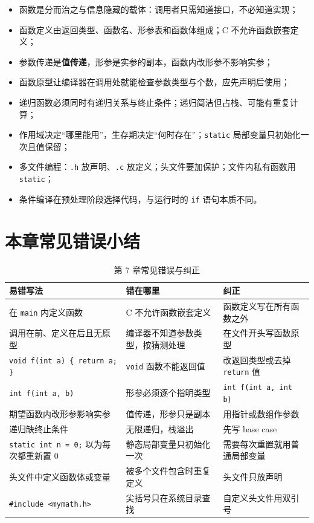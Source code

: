 \begin{itemize}
  \item 函数是分而治之与信息隐藏的载体：调用者只需知道接口，不必知道实现；
  \item 函数定义由返回类型、函数名、形参表和函数体组成；C 不允许函数嵌套定义；
  \item 参数传递是\textbf{值传递}，形参是实参的副本，函数内改形参不影响实参；
  \item 函数原型让编译器在调用处就能检查参数类型与个数，应先声明后使用；
  \item 递归函数必须同时有递归关系与终止条件；递归简洁但占栈、可能有重复计算；
  \item 作用域决定“哪里能用”，生存期决定“何时存在”；\texttt{static} 局部变量只初始化一次且值保留；
  \item 多文件编程：\texttt{.h} 放声明、\texttt{.c} 放定义；头文件要加保护；文件内私有函数用 \texttt{static}；
  \item 条件编译在预处理阶段选择代码，与运行时的 \texttt{if} 语句本质不同。
\end{itemize}

\section{本章常见错误小结}

\begin{table}[htbp]
\centering
\caption{第 7 章常见错误与纠正}
\small
\begin{tabularx}{\textwidth}{@{}lXl@{}}
\toprule
易错写法 & 错在哪里 & 纠正 \\
\midrule
在 \texttt{main} 内定义函数 & C 不允许函数嵌套定义 & 函数定义写在所有函数之外 \\
调用在前、定义在后且无原型 & 编译器不知道参数类型，按猜测处理 & 在文件开头写函数原型 \\
\texttt{void f(int a) \{ return a; \}} & \texttt{void} 函数不能返回值 & 改返回类型或去掉 \texttt{return} 值 \\
\texttt{int f(int a, b)} & 形参必须逐个指明类型 & \texttt{int f(int a, int b)} \\
期望函数内改形参影响实参 & 值传递，形参只是副本 & 用指针或数组作参数 \\
递归缺终止条件 & 无限递归，栈溢出 & 先写 base case \\
\texttt{static int n = 0;} 以为每次都重新置 0 & 静态局部变量只初始化一次 & 需要每次重置就用普通局部变量 \\
头文件中定义函数体或变量 & 被多个文件包含时重复定义 & 头文件只放声明 \\
\texttt{\#include <mymath.h>} & 尖括号只在系统目录查找 & 自定义头文件用双引号 \\
\bottomrule
\end{tabularx}
\end{table}
